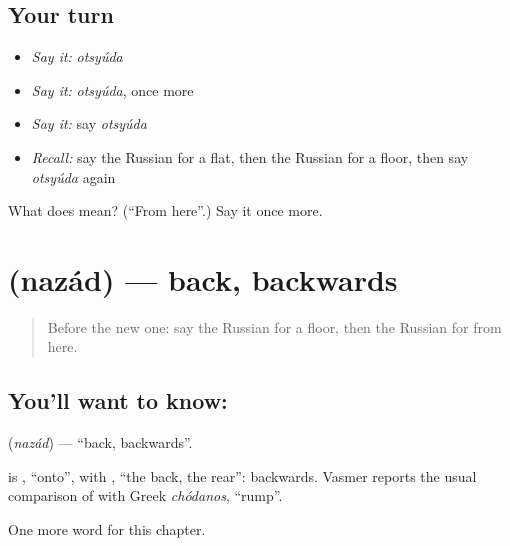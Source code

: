 \subsection*{Your turn}
\begin{itemize}
\raggedright
  \item \emph{Say it:} \emph{otsyúda}
  \item \emph{Say it:} \emph{otsyúda}, once more
  \item \emph{Say it:} say \emph{otsyúda}
  \item \emph{Recall:} say the Russian for a flat, then the Russian for a floor, then say \emph{otsyúda} again
\end{itemize}

\begin{tcolorbox}[breakable,colback=teal!4,colframe=teal!35!black,title={Before you move on}]
What does  mean? (\textquotedblleft{}From here\textquotedblright{}.) Say it once more.
\end{tcolorbox}
\section[\texorpdfstring{\ru{назад} (nazád)}{назад (nazád)}]{ (nazád) — back, backwards}

\label{lesson:RU-C214-nazad}



\begin{quote}
Before the new one: say the Russian for a floor, then the Russian for from here.
\end{quote}

\subsection*{You'll want to know: }
\textbf{} (\emph{nazád}) — \textquotedblleft{}back, backwards\textquotedblright{}.

\begin{cousinweb}
\textbf{} is \emph{}, \textquotedblleft{}onto\textquotedblright{}, with \emph{}, \textquotedblleft{}the back, the rear\textquotedblright{}: backwards. Vasmer reports the usual comparison of \emph{} with Greek \emph{chódanos}, \textquotedblleft{}rump\textquotedblright{}.
\end{cousinweb}

\begin{grammarlens}[title={What you've built}]
One more word for this chapter.
\end{grammarlens}

